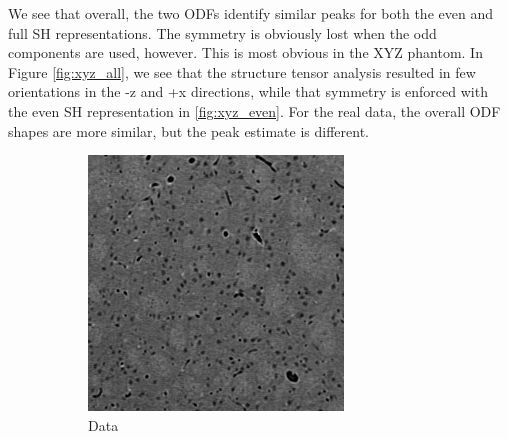 \documentclass[11pt]{article}
\begin{document}
We see that overall, the two ODFs identify similar peaks for both the even
and full SH representations. The symmetry is obviously lost when the odd
components are used, however. This is most obvious in the XYZ phantom.
In Figure \ref{fig:xyz_all}, we see that the structure tensor analysis
resulted in few orientations in the -z and +x directions, while that symmetry
is enforced with the even SH representation in \ref{fig:xyz_even}. For the
real data, the overall ODF shapes are more similar, but the peak estimate
is different.

\begin{figure}[h]
  \centering
  \begin{subfigure}[b]{0.3\textwidth}
    \includegraphics[width=\linewidth]{figs/xray_sl84}
    \caption{Data}
  \end{subfigure}
  \hspace{1em}
  \begin{subfigure}[b]{0.3\textwidth}

\end{subfigure}
\end{figure}
\end{document}
